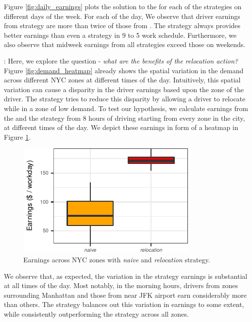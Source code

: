 Figure \ref{fig:daily_earnings} plots the solution to the {\originalproblem} for each of the strategies on different days of the week. For each of the day, We observe that driver earnings from {\relocationflexible} strategy are more than twice of those from {\naive}. The {\flexible} strategy always provides better earnings than even a {\relocation} strategy in 9 to 5 work schedule. Furthermore, we also observe that midweek earnings from all strategies exceed those on weekends.

: Here, we explore the question - \textit{what are the benefits of the relocation action?} Figure \ref{fig:demand_heatmap} already shows the spatial variation in the demand across different NYC zones at different times of the day. Intuitively, this spatial variation can cause a disparity in the driver earnings based upon the zone of the driver. The {\relocation} strategy tries to reduce this disparity by allowing a driver to relocate while in a zone of low demand. To test our hypothesis, we calculate earnings from the {\naive} and the {\relocation} strategy from 8 hours of driving starting from every zone in the city, at different times of the day. We depict these earnings in form of a heatmap in Figure \ref{fig:earnings_heatmap}.

\begin{figure}[hb]
	\includegraphics{figures/earnings_heatmap.pdf}
	\caption{Earnings across NYC zones with \textit{naive} and \textit{relocation} strategy.}
	\label{fig:earnings_heatmap}
\end{figure}

We observe that, as expected, the variation in the {\naive} strategy earnings is substantial at all times of the day. Most notably, in the morning hours, drivers from zones surrounding Manhattan and those from near JFK airport earn considerably more than others. The {\relocation} strategy balances out this variation in earnings to some extent, while consistently outperforming the {\naive} strategy across all zones.

